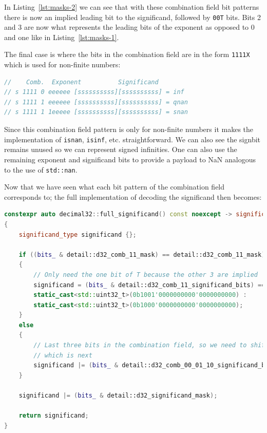 \documentclass[acmsmall]{acmart}
\newcommand{\code}[1]{\texttt{#1}}
\begin{document}
In Listing~\ref{lst:masks-2} we can see that with these combination field bit patterns there is now an implied leading bit to the significand, followed by \code{00T} bits.
Bits 2 and 3 are now what represents the leading bits of the exponent as opposed to 0 and one like in Listing~\ref{lst:masks-1}.

The final case is where the bits in the combination field are in the form \code{1111X} which is used for non-finite numbers:

\begin{lstlisting}[language=C++, caption={Combination Field Pattern 3}, label={lst:non-finite}]
//    Comb.  Exponent          Significand
// s 1111 0 eeeeee [ssssssssss][ssssssssss] = inf
// s 1111 1 eeeeee [ssssssssss][ssssssssss] = qnan
// s 1111 1 1eeeee [ssssssssss][ssssssssss] = snan
\end{lstlisting}

Since this combination field pattern is only for non-finite numbers it makes the implementation of \code{isnan}, \code{isinf}, etc. straightforward.
We can also see the signbit remains unused so we can represent signed infinities.
One can also use the remaining exponent and significand bits to provide a payload to NaN analogous to the use of \code{std::nan}\cite{cppreference_nan}.

Now that we have seen what each bit pattern of the combination field corresponds to; the full implementation of decoding the significand then becomes:

\begin{lstlisting}[language=C++, caption={Decoding \code{decimal32} significand}, label={lst:decode-sig}]
constexpr auto decimal32::full_significand() const noexcept -> significand_type
{
    significand_type significand {};

    if ((bits_ & detail::d32_comb_11_mask) == detail::d32_comb_11_mask)
    {
        // Only need the one bit of T because the other 3 are implied
        significand = (bits_ & detail::d32_comb_11_significand_bits) == detail::d32_comb_11_significand_bits ?
        static_cast<std::uint32_t>(0b1001'0000000000'0000000000) :
        static_cast<std::uint32_t>(0b1000'0000000000'0000000000);
    }
    else
    {
        // Last three bits in the combination field, so we need to shift past the exp field
        // which is next
        significand |= (bits_ & detail::d32_comb_00_01_10_significand_bits) >> detail::d32_exponent_bits;
    }

    significand |= (bits_ & detail::d32_significand_mask);

    return significand;
}
\end{lstlisting}
\end{document}
